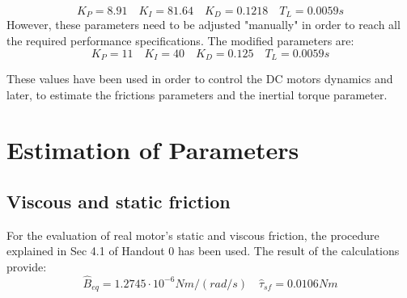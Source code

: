 \documentclass[11pt]{article}
\begin{document}
	\begin{equation}
		K_P = 8.91 \quad K_I = 81.64 \quad K_D = 0.1218 \quad T_L = 0.0059s
	\end{equation} 
However, these parameters need to be adjusted "manually" in order to reach all the required performance specifications. The modified parameters are:
	\begin{equation}
		K_P = 11 \quad K_I = 40 \quad K_D = 0.125 \quad T_L = 0.0059s
	\end{equation}

These values have been used in order to control the DC motors dynamics and later, to estimate the frictions parameters and the inertial
torque parameter.

\newpage
\section{Estimation of Parameters}
	\subsection{Viscous and static friction}
	For the evaluation of real motor's static and viscous friction, the procedure explained in Sec 4.1 of Handout 0 has been used. The result of the calculations provide:
		\begin{equation}
			\hat B_{eq} = 1.2745\cdot10^{-6}Nm/(rad/s) \quad \hat\tau_{sf} = 0.0106Nm
		\end{equation}
\end{document}
